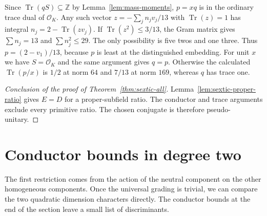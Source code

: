 \documentclass[11pt,reqno]{amsart}
\theoremstyle{remark}\newtheorem{remark}[theorem]{Remark}
\numberwithin{equation}{section}
\begin{document}
Since $\operatorname{Tr}(q S)\subseteq\mathbb Z$ by
Lemma~\ref{lem:mass-moments}, $p=xq$ is in the ordinary trace dual
of $\mathcal O_K$. Any such vector $z=-\sum_j n_jv_j/13$ with
$\operatorname{Tr}(z)=1$ has integral $n_j=2-\operatorname{Tr}(zv_j)$.
If $\operatorname{Tr}(z^2)\le3/13$, the Gram matrix gives
$\sum n_j=13$ and $\sum n_j^2\le29$. The only possibility is five
twos and one three. Thus $p=(2-v_1)/13$, because $p$ is least at
the distinguished embedding. For unit $x$ we have $S=\mathcal O_K$
and the same argument gives $q=p$. Otherwise the calculated
$\operatorname{Tr}(p/x)$ is $1/2$ at norm $64$ and $7/13$ at norm
$169$, whereas $q$ has trace one.

\begin{proof}[Conclusion of the proof of Theorem~\ref{thm:sextic-all}]
Lemma~\ref{lem:sextic-proper-ratio} gives $E=D$ for a proper-subfield
ratio. The conductor and trace arguments exclude every primitive ratio.
The chosen conjugate is therefore pseudo-unitary.
\end{proof}

\section{Conductor bounds in degree two}
\label{sec:quadratic-global-reduction}

The first restriction comes from the action of the neutral component on the other homogeneous components. Once the universal grading is trivial, we can compare the two quadratic dimension characters directly. The conductor bounds at the end of the section leave a small list of discriminants.
\end{document}
